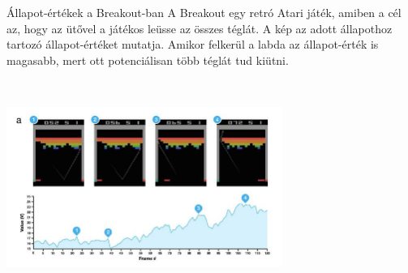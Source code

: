 \documentclass[english, aspectratio=169]{beamer}
\begin{document}
\begin{frame}{Állapot-értékek a Breakout-ban}
A Breakout egy retró Atari játék, amiben a cél az, hogy az ütővel a játékos leüsse az összes téglát. A kép az adott állapothoz tartozó állapot-értéket mutatja. Amikor felkerül a labda az állapot-érték is magasabb, mert ott potenciálisan több téglát tud kiütni. 
\begin{center}
\includegraphics[width=9cm, height=7cm, keepaspectratio]{images/breakout.png}
\end{center}
\end{frame}
\end{document}
